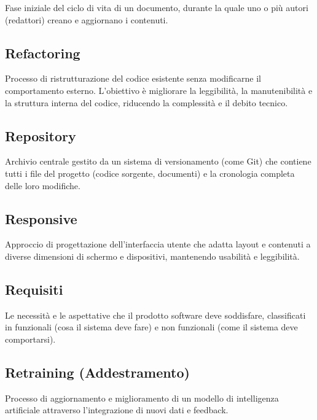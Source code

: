 \documentclass[a4paper, 11pt, oneside]{scrartcl} %
\begin{document}
Fase iniziale del ciclo di vita di un documento, durante la quale uno o più autori (redattori) creano e aggiornano i contenuti.

\vspace{0.5cm}

\subsection*{Refactoring}
Processo di ristrutturazione del codice esistente senza modificarne il comportamento esterno. L'obiettivo è migliorare la leggibilità, la manutenibilità e la struttura interna del codice, riducendo la complessità e il debito tecnico.
\vspace{0.5cm}

\subsection*{Repository}


Archivio centrale gestito da un sistema di versionamento (come Git) che contiene tutti i file del progetto (codice sorgente, documenti) e la cronologia completa delle loro modifiche.

\vspace{0.5cm}

\subsection*{Responsive}
Approccio di progettazione dell'interfaccia utente che adatta layout e contenuti a diverse dimensioni di schermo e dispositivi, mantenendo usabilità e leggibilità.
\vspace{0.5cm}

\subsection*{Requisiti}


Le necessità e le aspettative che il prodotto software deve soddisfare, classificati in funzionali (cosa il sistema deve fare) e non funzionali (come il sistema deve comportarsi).

\vspace{0.5cm}

\subsection*{Retraining (Addestramento)}
Processo di aggiornamento e miglioramento di un modello di intelligenza artificiale attraverso l'integrazione di nuovi dati e feedback.
\vspace{0.5cm}
\end{document}
